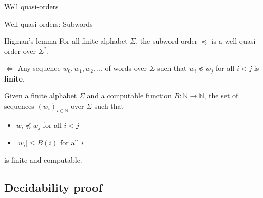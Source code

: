 \documentclass{beamer}
\begin{document}
\begin{frame}{Well quasi-orders}
		 
	
		
		



%	
	
\end{frame}


\begin{frame}{Well quasi-orders: Subwords}
	
	\begin{block}{Higman's lemma}
		For all finite alphabet $\Sigma$, the subword order $\preceq$ is a well quasi-order over $\Sigma^*$.
	\end{block}

	\pause
	$\Leftrightarrow$ Any sequence $w_0, w_1, w_2, \ldots$ of words over $\Sigma$ such that $w_i \npreceq w_j$ for all $i<j$ is \textbf{finite}.
	
	\vspace{1cm}
	\pause
	Given a finite alphabet $\Sigma$ and a computable function $B : \mathbb{N} \to \mathbb{N}$, the set of sequences $(w_i)_{i \in \mathbb{N}}$ over $\Sigma$ such that
	\begin{itemize}
		\item $w_i \npreceq w_j$ for all $i<j$ 
		\item $|w_i| \leq B(i)$ for all $i$
	\end{itemize}
is finite and computable.
\end{frame}

\subsection{Decidability proof}
\end{document}
